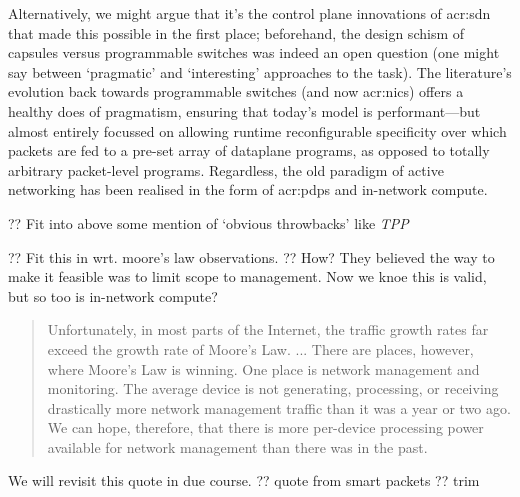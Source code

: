 Alternatively, we might argue that it's the control plane innovations of \gls{acr:sdn} that made this possible in the first place; beforehand, the design schism of capsules versus programmable switches was indeed an open question (one might say between `pragmatic' and `interesting' approaches to the task).
The literature's evolution back towards programmable switches (and now \glspl{acr:nic}) offers a healthy does of pragmatism, ensuring that today's model is performant---but almost entirely focussed on allowing runtime reconfigurable specificity over which packets are fed to a pre-set array of dataplane programs, as opposed to totally arbitrary packet-level programs.
Regardless, the old paradigm of active networking has been realised in the form of \glspl{acr:pdp} and in-network compute.

?? Fit into above some mention of `obvious throwbacks' like \emph{TPP}~\parencite{DBLP:conf/sigcomm/JeyakumarAGKM14}

?? Fit this in wrt. moore's law observations.
?? How? They believed the way to make it feasible was to limit scope to management. Now we knoe this is valid, but so too is in-network compute?
\begin{quotation}
	\noindent
	Unfortunately, in most parts of the Internet, the traffic growth rates far exceed the growth rate of Moore’s Law. ...
	There are places, however, where Moore’s Law is winning.
	One place is network management and monitoring.
	The average device is not generating, processing, or receiving drastically more network management traffic than it was a year or two ago.
	We can hope, therefore, that there is more per-device processing power available for network management than there was in the past.
	\strut\hfill\parencite[p. 68]{DBLP:journals/tocs/SchwartzJSZRP00}
\end{quotation}
We will revisit this quote in due course. ?? quote from smart packets ?? trim

